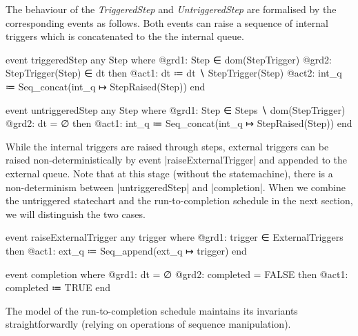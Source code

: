 The behaviour of the \emph{TriggeredStep} and \emph{UntriggeredStep} are formalised by the corresponding events as follows. Both events can raise a sequence of internal triggers which is concatenated to the the internal queue.
\begin{center}
    \begin{minipage}[t]{0.48\textwidth}
\begin{EventBcode}
event triggeredStep 
any Step where 
    @grd1: Step ∈ dom(StepTrigger)		
    @grd2: StepTrigger(Step) ∈ dt
then 
    @act1: dt ≔ dt ∖ {StepTrigger(Step)}
    @act2: int_q ≔ Seq_concat(int_q ↦ StepRaised(Step))
end
\end{EventBcode}
    \end{minipage}
    \hfill
    \begin{minipage}[t]{0.51\textwidth}
\begin{EventBcode}
event untriggeredStep 
any Step where 
    @grd1: Step ∈ Steps ∖ dom(StepTrigger)	
    @grd2: dt = ∅
then 
	@act1: int_q ≔ Seq_concat(int_q ↦ StepRaised(Step))
end
\end{EventBcode}
    \end{minipage}
\end{center}
While the internal triggers are raised through steps, external triggers can be raised non-deterministically by event |raiseExternalTrigger| and appended to the external queue. 
Note that at this stage (without the statemachine), there is a non-determinism between |untriggeredStep| and |completion|. 
When we combine the untriggered statechart and the run-to-completion schedule in the next section, we will distinguish the two cases.
\begin{center}
    \begin{minipage}[t]{0.55\textwidth}
\begin{EventBcode}
event raiseExternalTrigger
any trigger where
    @grd1: trigger ∈ ExternalTriggers
then
    @act1: ext_q ≔ Seq_append(ext_q ↦ trigger)
end
\end{EventBcode}
    \end{minipage}
    \hfill
    \begin{minipage}[t]{0.43\textwidth}
\begin{EventBcode}
event completion
where
    @grd1: dt = ∅
    @grd2: completed = FALSE
then
    @act1: completed ≔ TRUE
end
\end{EventBcode}
    \end{minipage}
\end{center}

The model of the run-to-completion schedule maintains its invariants straightforwardly (relying on operations of sequence manipulation).